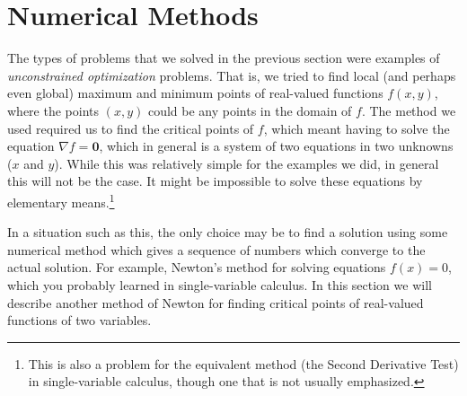 \section{Numerical Methods}
The types of problems that we solved in the previous section were examples of \emph{unconstrained optimization}
problems. That is, we tried to find local (and perhaps even global) maximum and minimum points of real-valued
functions $f(x,y)$, where the points $(x,y)$ could be any points in the domain of $f$. 
The method we used required us to find the critical points of $f$, which meant having to solve the equation
$\nabla f = \mathbf{0}$, which in general is a system of two equations in two unknowns ($x$ and $y$). 
While this was relatively simple for the examples we did, in general this will not be the case. 
It might be impossible to solve these equations 
by elementary means.\footnote{This is also a problem
for the equivalent method (the Second Derivative Test) in single-variable calculus, though one that is not usually
emphasized.}

In a situation such as this, the
only choice may be to find a solution using some numerical method which gives a sequence of numbers which
converge to the actual solution. For example, Newton's method for solving equations $f(x) = 0$, which you probably
learned in single-variable calculus. In this section we will describe another method of Newton for
finding critical points of real-valued functions of two variables.

